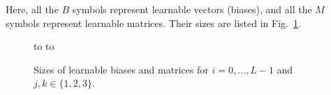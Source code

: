 \documentclass{ecai}
\begin{document}
Here, all the $B$ symbols represent learnable vectors (biases), and all the
$M$ symbols represent learnable matrices. Their sizes are listed in Fig.~\ref{matrice-sizes}.

\begin{figure}
\hbox to
\hbox to
    \centering
    \caption{\label{matrice-sizes}Sizes of learnable biases and matrices for $i=0,\ldots,L-1$ and $j,k\in\{1,2,3\}$.}
\end{figure}

\end{document}
